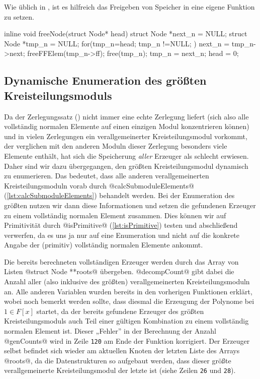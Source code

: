 Wie üblich in \Clang, ist es hilfreich das Freigeben von Speicher in eine 
eigene Funktion zu setzen.

\begin{ccode}[caption={[\texttt{void freeNode} aus 
 \url{../Sage/enumeratePCNs.c}]Aus \url{../Sage/enumeratePCNs.c}},
  label=lst:freeNode]
inline void freeNode(struct Node* head){
    struct Node *next_n = NULL;
    struct Node *tmp_n = NULL;
    for(tmp_n=head; tmp_n !=NULL; ){
        next_n = tmp_n->next;
        freeFFElem(tmp_n->ff);
        free(tmp_n);
        tmp_n = next_n;
    }
    head = 0;
}
\end{ccode}

\subsection{Dynamische Enumeration des größten Kreisteilungsmoduls}
\label{sub:dynamische_enumeration}

Da der Zerlegungssatz () nicht immer eine echte
Zerlegung liefert (sich also alle vollständig normalen Elemente auf einen
einzigen Modul konzentrieren können) und in vielen Zerlegungen ein 
verallgemeinerter
Kreisteilungsmodul vorkommt, der verglichen mit den anderen Moduln dieser
Zerlegung besonders viele Elemente enthält, hat sich die Speicherung
\emph{aller} Erzeuger als schlecht erwiesen. Daher sind wir dazu übergegangen,
den größten Kreisteilungsmodul dynamisch zu enumerieren. Das bedeutet, dass
alle anderen verallgemeinerten Kreisteilungsmoduln vorab durch 
@calcSubmoduleElements@ (\autoref{lst:calcSubmoduleElements}) behandelt werden.
Bei der Enumeration des größten nutzen wir dann diese Informationen und setzen
die gefundenen Erzeuger zu einem vollständig normalen Element zusammen. Dies
können wir auf Primitivität durch @isPrimitive@
(\autoref{lst:isPrimitive}) testen und abschließend verwerfen, da es uns ja nur
auf eine Enumeration und nicht auf die konkrete Angabe der 
(primitiv) vollständig normalen Elemente ankommt.

Die bereits berechneten vollständigen Erzeuger werden durch 
das Array von Listen @struct Node **roots@ übergeben. @decompCount@ gibt dabei
die Anzahl aller (also inklusive des größten) verallgemeinerten
Kreisteilungsmoduln an. Alle anderen Variablen wurden bereits in den vorherigen
Funktionen erklärt, wobei noch bemerkt werden sollte, dass diesmal die
Erzeugung der Polynome bei $1 \in F[x]$ startet, da der bereits gefundene
Erzeuger des größten Kreisteilungsmoduls auch Teil einer gültigen Kombination
zu einem vollständig normalen Element ist. Dieser „Fehler” in der Berechnung
der Anzahl @genCounts@ wird in Zeile \texttt{120} am Ende der Funktion
korrigiert. Der Erzeuger selbst befindet sich wieder am aktuellen Knoten der
letzten Liste des Arrays @roots@, da die Datenstrukturen so
aufgebaut werden, dass dieser größte verallgemeinerte Kreisteilungsmodul der
letzte ist (siehe Zeilen \texttt{26} und \texttt{28}).


